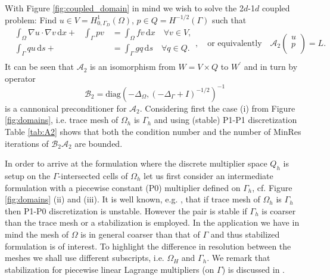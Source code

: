 With Figure \ref{fig:coupled_domain} in mind we wish to solve the 2$d$-1$d$
coupled problem: Find $u\in V=H^1_{0, \Gamma_{D}}(\Omega)$,
$p\in Q=H^{-1/2}(\Gamma)$ such that
\begin{equation}\label{eq:A2}
\begin{aligned}
  &\int_{\Omega}\nabla u\cdot\nabla v\,\mathrm{d}x + &{\int_{\Gamma}p v} &= \int_{\Omega}f v\,\mathrm{d}x\quad\forall v\in V,\\
  &{\int_{\Gamma}q u\,\mathrm{d}s} + &\phantom{\int{\Gamma}p v} &= \int_{\Gamma}g q\,\mathrm{d}s\quad\forall q\in Q.\\
\end{aligned},
\quad\mbox{or equivalently}\quad
\mathcal{A}_2\begin{pmatrix}
u\\
p\\
\end{pmatrix} = L.
\end{equation}
%
It can be seen that $\mathcal{A}_2$ is an isomorphism from $W=V\times Q$
to $W^{'}$ and in turn by \cite{mardal2011preconditioning} operator
\[
\mathcal{B}_2=\text{diag}(-\Delta_{\Omega}, (-\Delta_{\Gamma}+I)^{-1/2})^{-1}
\]
is a cannonical preconditioner for $\mathcal{A}_2$. Considering first the
case (i) from Figure \ref{fig:domains}, i.e. trace mesh of $\Omega_h$ is
$\Gamma_h$ and using (stable) P1-P1 discretization Table \ref{tab:A2} shows
that both the condition number and the number of MinRes iterations of $\mathcal{B}_2\mathcal{A}_2$
are bounded.

In order to arrive at the formulation where the discrete multiplier space
$Q_h$ is setup on the $\Gamma$-intersected cells of $\Omega_h$ let us first
consider an intermediate formulation with a piecewise constant (P0) multiplier defined
on $\Gamma_h$, cf. Figure \ref{fig:domains} (ii) and (iii). It is well known, e.g.
\cite[Ch 11.3]{steinbach2007numerical}, that if trace mesh of $\Omega_h$ is $\Gamma_h$ then P1-P0 discretization is
unstable. However the pair is stable if $\Gamma_h$ is coarser than the trace
mesh or a stabilization is employed. In the application we have in mind
the mesh of $\Omega$ is in general coarser than that of $\Gamma$ and thus
stabilized formulation is of interest. To highlight the difference in resolution
between the meshes we shall use different subscripts, i.e. $\Omega_H$ and
$\Gamma_h$. We remark that stabilization for piecewise linear Lagrange multipliers
(on $\Gamma$) is discussed in \cite{burman2009interior}.

